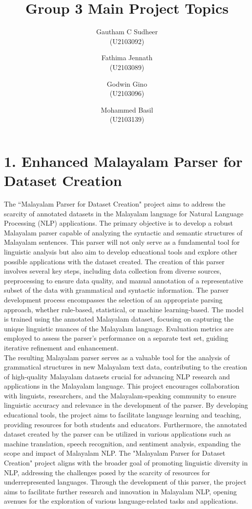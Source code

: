 \documentclass[12pt]{book}
\title{Group 3 Main Project Topics}
\author{
	Gautham C Sudheer \\ (U2103092) \and
	Fathima Jennath \\ (U2103089) \and
	Godwin Gino \\ (U2103096) \and
	Mohammed Basil \\ (U2103139)
}
\date{}
\begin{document}
	
	\maketitle
	
	\chapter*{1. Enhanced Malayalam Parser for Dataset Creation}
	\thispagestyle{empty}
	The ``Malayalam Parser for Dataset Creation" project aims to address the scarcity of annotated datasets in the Malayalam language for Natural Language Processing (NLP) applications. The primary objective is to develop a robust Malayalam parser capable of analyzing the syntactic and semantic structures of Malayalam sentences. This parser will not only serve as a fundamental tool for linguistic analysis but also aim to develop educational tools and explore other possible applications with the dataset created. The creation of this parser involves several key steps, including data collection from diverse sources, preprocessing to ensure data quality, and manual annotation of a representative subset of the data with grammatical and syntactic information. The parser development process encompasses the selection of an appropriate parsing approach, whether rule-based, statistical, or machine learning-based. The model is trained using the annotated Malayalam dataset, focusing on capturing the unique linguistic nuances of the Malayalam language. Evaluation metrics are employed to assess the parser's performance on a separate test set, guiding iterative refinement and enhancement.\\
	
	The resulting Malayalam parser serves as a valuable tool for the analysis of grammatical structures in new Malayalam text data, contributing to the creation of high-quality Malayalam datasets crucial for advancing NLP research and applications in the Malayalam language. This project encourages collaboration with linguists, researchers, and the Malayalam-speaking community to ensure linguistic accuracy and relevance in the development of the parser. By developing educational tools, the project aims to facilitate language learning and teaching, providing resources for both students and educators. Furthermore, the annotated dataset created by the parser can be utilized in various applications such as machine translation, speech recognition, and sentiment analysis, expanding the scope and impact of Malayalam NLP. The "Malayalam Parser for Dataset Creation" project aligns with the broader goal of promoting linguistic diversity in NLP, addressing the challenges posed by the scarcity of resources for underrepresented languages. Through the development of this parser, the project aims to facilitate further research and innovation in Malayalam NLP, opening avenues for the exploration of various language-related tasks and applications.
		
\end{document}
